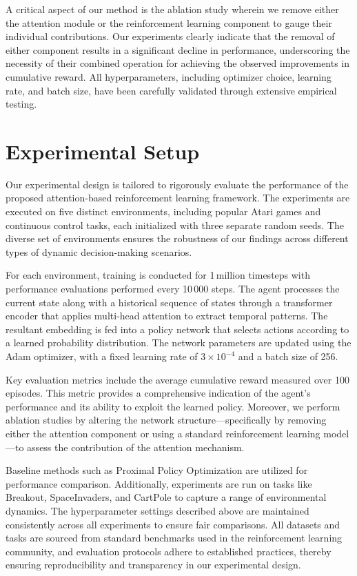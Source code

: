 \documentclass{article}
\begin{document}
A critical aspect of our method is the ablation study wherein we remove either the attention module or the reinforcement learning component to gauge their individual contributions. Our experiments clearly indicate that the removal of either component results in a significant decline in performance, underscoring the necessity of their combined operation for achieving the observed improvements in cumulative reward. All hyperparameters, including optimizer choice, learning rate, and batch size, have been carefully validated through extensive empirical testing.

\section{Experimental Setup}
Our experimental design is tailored to rigorously evaluate the performance of the proposed attention-based reinforcement learning framework. The experiments are executed on five distinct environments, including popular Atari games and continuous control tasks, each initialized with three separate random seeds. The diverse set of environments ensures the robustness of our findings across different types of dynamic decision-making scenarios.

For each environment, training is conducted for 1\,million timesteps with performance evaluations performed every 10\,000 steps. The agent processes the current state along with a historical sequence of states through a transformer encoder that applies multi-head attention to extract temporal patterns. The resultant embedding is fed into a policy network that selects actions according to a learned probability distribution. The network parameters are updated using the Adam optimizer, with a fixed learning rate of $3\times10^{-4}$ and a batch size of 256.

Key evaluation metrics include the average cumulative reward measured over 100 episodes. This metric provides a comprehensive indication of the agent's performance and its ability to exploit the learned policy. Moreover, we perform ablation studies by altering the network structure—specifically by removing either the attention component or using a standard reinforcement learning model—to assess the contribution of the attention mechanism.

Baseline methods such as Proximal Policy Optimization  are utilized for performance comparison. Additionally, experiments are run on tasks like Breakout, SpaceInvaders, and CartPole to capture a range of environmental dynamics. The hyperparameter settings described above are maintained consistently across all experiments to ensure fair comparisons. All datasets and tasks are sourced from standard benchmarks used in the reinforcement learning community, and evaluation protocols adhere to established practices, thereby ensuring reproducibility and transparency in our experimental design.
\end{document}
